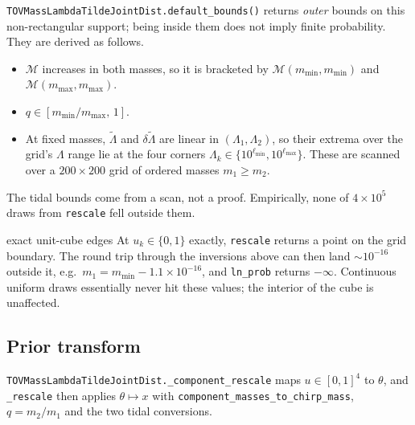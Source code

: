 \documentclass[11pt,a4paper]{article}
\newcommand{\Mc}{\mathcal{M}}
\newcommand{\lt}{\tilde{\Lambda}}
\newcommand{\dlt}{\delta\tilde{\Lambda}}
\newcommand{\code}[1]{\texttt{#1}}
\begin{document}
\code{TOVMassLambdaTildeJointDist.default\_bounds()} returns \emph{outer}
bounds on this non-rectangular support; being inside them does not imply
finite probability. They are derived as follows.
\begin{itemize}
  \item $\Mc$ increases in both masses, so it is bracketed by
    $\Mc(m_{\min}, m_{\min})$ and $\Mc(m_{\max}, m_{\max})$.
  \item $q \in [m_{\min}/m_{\max},\, 1]$.
  \item At fixed masses, $\lt$ and $\dlt$ are linear in $(\Lambda_1, \Lambda_2)$,
    so their extrema over the grid's $\Lambda$ range lie at the four corners
    $\Lambda_k \in \{10^{\ell_{\min}}, 10^{\ell_{\max}}\}$. These are scanned
    over a $200 \times 200$ grid of ordered masses $m_1 \ge m_2$.
\end{itemize}
The tidal bounds come from a scan, not a proof. Empirically, none of
$4\times10^5$ draws from \code{rescale} fell outside them.

\begin{caveat}{exact unit-cube edges}
At $u_k \in \{0, 1\}$ exactly, \code{rescale} returns a point on the grid
boundary. The round trip through the inversions above can then land
$\sim10^{-16}$ outside it, e.g.\ $m_1 = m_{\min} - 1.1\times10^{-16}$, and
\code{ln\_prob} returns $-\infty$. Continuous uniform draws essentially never hit
these values; the interior of the cube is unaffected.
\end{caveat}

\subsection{Prior transform}
\label{sec:binary_rescale}

\code{TOVMassLambdaTildeJointDist.\_component\_rescale} maps
$u \in [0,1]^4$ to $\theta$, and \code{\_rescale} then applies
$\theta \mapsto x$ with \code{component\_masses\_to\_chirp\_mass},
$q = m_2/m_1$ and the two tidal conversions.
\end{document}

